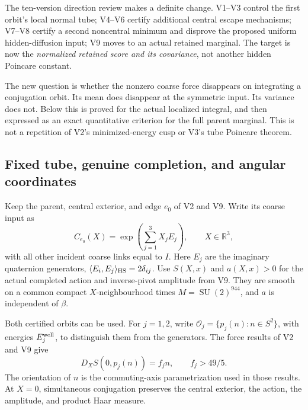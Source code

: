 \documentclass[11pt,oneside]{article}
\DeclareMathOperator{\SU}{SU}
\begin{document}
The ten-version direction review makes a definite change.
V1--V3 control the first orbit's local normal tube;
V4--V6 certify additional central escape mechanisms;
V7--V8 certify a second noncentral minimum and disprove
the proposed uniform hidden-diffusion input; V9 moves to
an actual retained marginal. The target is now the
\emph{normalized retained score and its covariance},
not another hidden Poincare constant.

The new question is whether the nonzero coarse force
disappears on integrating a conjugation orbit. Its mean
does disappear at the symmetric input. Its variance does
not. Below this is proved for the actual localized
integral, and then expressed as an exact quantitative
criterion for the full parent marginal. This is not a
repetition of V2's minimized-energy cusp or V3's tube
Poincare theorem.

\subsection{Fixed tube, genuine completion, and angular coordinates}

Keep the parent, central exterior, and edge \(e_0\) of V2
and V9. Write its coarse input as
\[
 C_{e_0}(X)=\exp\!\left(\sum_{j=1}^3X_jE_j\right),
 \qquad X\in\mathbb R^3,
\]
with all other incident coarse links equal to \(I\).
Here \(E_j\) are the imaginary quaternion generators,
\(\langle E_i,E_j\rangle_{\rm HS}=2\delta_{ij}\).
Use \(S(X,x)\) and \(a(X,x)>0\) for the actual completed
action and inverse-pivot amplitude from V9. They are
smooth on a common compact \(X\)-neighbourhood times
\(M=\SU(2)^{944}\), and \(a\) is independent of \(\beta\).

Both certified orbits can be used. For
\(j=1,2\), write \(\mathcal O_j=\{p_j(n):n\in S^2\}\),
with energies \(E_j^{\rm well}\), to distinguish them from
the generators. The force results of V2 and V9 give
\begin{equation}\label{eq:f13v10-orbit-force}
 D_XS(0,p_j(n))=f_jn,\qquad f_j>49/5.
\end{equation}
The orientation of \(n\) is the commuting-axis
parametrization used in those results. At \(X=0\),
simultaneous conjugation preserves the central exterior,
the action, the amplitude, and product Haar measure.
\end{document}
